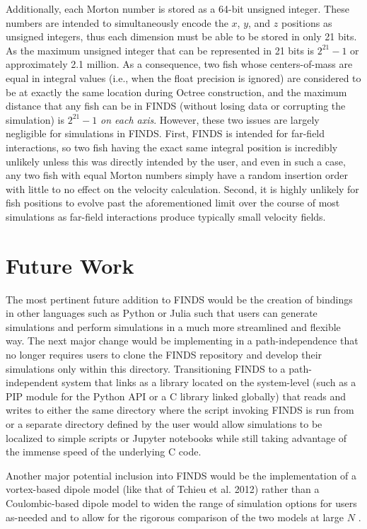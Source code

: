 \documentclass[letterpaper, 10pt, twoside]{LTJournalArticle}
\begin{document}
Additionally, each Morton number is stored as a 64-bit unsigned integer. These
numbers are intended to simultaneously encode the $x$, $y$, and $z$ positions
as unsigned integers, thus each dimension must be able to be stored in only 21
bits. As the maximum unsigned integer that can be represented in 21 bits is
$2^{21}-1$ or approximately 2.1 million. As a consequence, two fish whose
centers-of-mass are equal in integral values (i.e., when the float precision is
ignored) are considered to be at exactly the same location during Octree
construction, and the maximum distance that any fish can be in FINDS (without
losing data or corrupting the simulation) is $2^{21}-1$ \textit{on each axis}.
However, these two issues are largely negligible for simulations in FINDS.
First, FINDS is intended for far-field interactions, so two fish having the
exact same integral position is incredibly unlikely unless this was directly
intended by the user, and even in such a case, any two fish with equal Morton
numbers simply have a random insertion order with little to no effect on the
velocity calculation. Second, it is highly unlikely for fish positions to
evolve past the aforementioned limit over the course of most simulations as
far-field interactions produce typically small velocity fields.

\section{Future Work}
\label{section-future-work}

The most pertinent future addition to FINDS would be the creation of bindings
in other languages such as Python or Julia such that users can generate
simulations and perform simulations in a much more streamlined and flexible
way. The next major change would be implementing in a path-independence that no
longer requires users to clone the FINDS repository and develop their
simulations only within this directory. Transitioning FINDS to a
path-independent system that links as a library located on the system-level
(such as a PIP module for the Python API or a C library linked globally) that
reads and writes to either the same directory where the script invoking FINDS
is run from or a separate directory defined by the user would allow simulations
to be localized to simple scripts or Jupyter notebooks while still taking
advantage of the immense speed of the underlying C code.

Another major potential inclusion into FINDS would be the implementation of a
vortex-based dipole model (like that of Tchieu et al. 2012) rather than a
Coulombic-based dipole model to widen the range of simulation options for users
as-needed and to allow for the rigorous comparison of the two models at large
$N$ \cite{tchieu_et_al_2012}.
\end{document}
